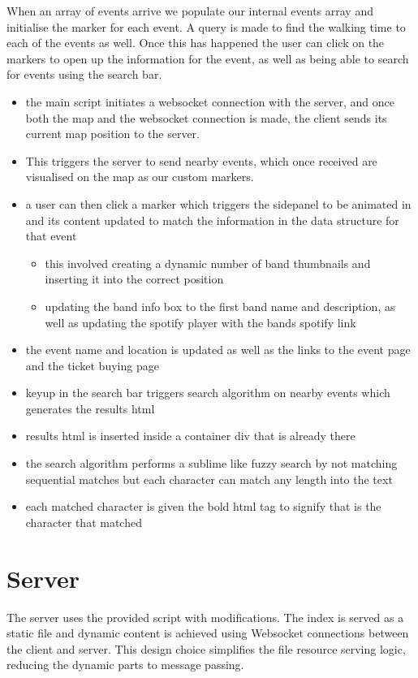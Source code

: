 \documentclass[10pt]{article}
\begin{document}
            When an array of events arrive we populate our internal events array and initialise the marker for each event. A query is made to find the walking time to each of the events as well. Once this has happened the user can click on the markers to open up the information for the event, as well as being able to search for events using the search bar.
            \begin{itemize}
                \item the main script initiates a websocket connection with the server, and once both the map and the websocket connection is made, the client sends its current map position to the server.
                \item This triggers the server to send nearby events, which once received are visualised on the map as our custom markers.
                \item a user can then click a marker which triggers the sidepanel to be animated in and its content updated to match the information in the data structure for that event
                \begin{itemize}
                    \item this involved creating a dynamic number of band thumbnails and inserting it into the correct position
                    \item updating the band info box to the first band name and description, as well as updating the spotify player with the bands spotify link
                \end{itemize}
                \item the event name and location is updated as well as the links to the event page and the ticket buying page

                \item keyup in the search bar triggers search algorithm on nearby events which generates the results html
                \item results html is inserted inside a container div that is already there
                \item the search algorithm performs a sublime like fuzzy search by not matching sequential matches but each character can match any length into the text
                \item each matched character is given the bold html tag to signify that is the character that matched
            \end{itemize}

    \section{Server}
        The server uses the provided script with modifications. The index is served as a static file and dynamic content is achieved using Websocket connections between the client and server. This design choice simplifies the file resource serving logic, reducing the dynamic parts to message passing.
\end{document}
